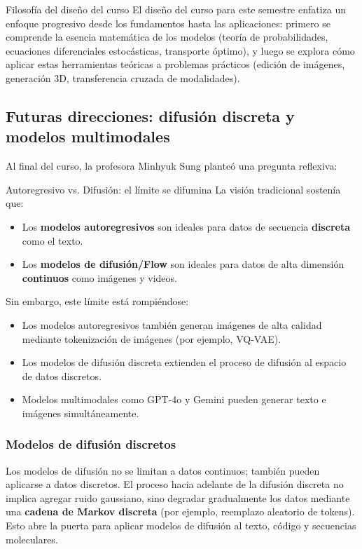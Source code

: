 \begin{importantbox}{Filosofía del diseño del curso}
El diseño del curso para este semestre enfatiza un enfoque progresivo desde los fundamentos hasta las aplicaciones: primero se comprende la esencia matemática de los modelos (teoría de probabilidades, ecuaciones diferenciales estocásticas, transporte óptimo), y luego se explora cómo aplicar estas herramientas teóricas a problemas prácticos (edición de imágenes, generación 3D, transferencia cruzada de modalidades).
\end{importantbox}

\subsection{Futuras direcciones: difusión discreta y modelos multimodales}

Al final del curso, la profesora Minhyuk Sung planteó una pregunta reflexiva:

\begin{importantbox}{Autoregresivo vs. Difusión: el límite se difumina}
La visión tradicional sostenía que:
\begin{itemize}
    \item Los \textbf{modelos autoregresivos} son ideales para datos de secuencia \textbf{discreta} como el texto.
    \item Los \textbf{modelos de difusión/Flow} son ideales para datos de alta dimensión \textbf{continuos} como imágenes y videos.
\end{itemize}

Sin embargo, este límite está rompiéndose:
\begin{itemize}
    \item Los modelos autoregresivos también generan imágenes de alta calidad mediante tokenización de imágenes (por ejemplo, VQ-VAE).
    \item Los modelos de difusión discreta extienden el proceso de difusión al espacio de datos discretos.
    \item Modelos multimodales como GPT-4o y Gemini pueden generar texto e imágenes simultáneamente.
\end{itemize}
\end{importantbox}

\subsubsection{Modelos de difusión discretos}

Los modelos de difusión no se limitan a datos continuos; también pueden aplicarse a datos discretos. El proceso hacia adelante de la difusión discreta no implica agregar ruido gaussiano, sino degradar gradualmente los datos mediante una \textbf{cadena de Markov discreta} (por ejemplo, reemplazo aleatorio de tokens). Esto abre la puerta para aplicar modelos de difusión al texto, código y secuencias moleculares.

